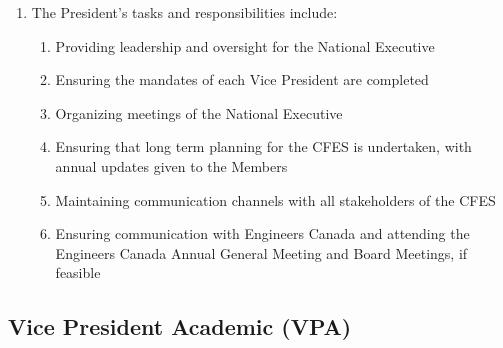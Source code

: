\begin{enumerate}
 \item The President’s tasks and responsibilities include:
  \begin{enumerate}
   \item Providing leadership and oversight for the National Executive
   \item Ensuring the mandates of each Vice President are completed
   \item Organizing meetings of the National Executive
   \item Ensuring that long term planning for the CFES is undertaken, with annual updates given to the Members
   \item Maintaining communication channels with all stakeholders of the CFES
   \item Ensuring communication with Engineers Canada and attending the Engineers Canada Annual General Meeting and Board Meetings, if feasible
  \end{enumerate}
\end{enumerate}

\subsection{Vice President Academic (VPA)}
\label{national-executive-vice-president-academic-vpa}

